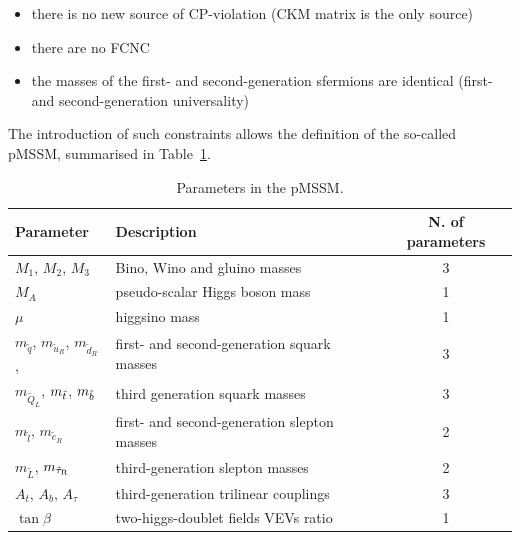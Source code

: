 				\begin{itemize}
					\item there is no new source of CP-violation (CKM matrix is the only source)
					\item there are no \ac{FCNC}
					\item the masses of the first- and second-generation sfermions are identical (first- and second-generation universality)
				\end{itemize}
				
				\noindent The introduction of such constraints allows the definition of the so-called \ac{pMSSM}, summarised in Table~\ref{tab:MSSM_mainFreePar}.
				
				\begin{table}[!htb]\centering\caption{Parameters in the pMSSM.}
				\renewcommand{\arraystretch}{1.3}
					\begin{tabular}{llc}
					\toprule
					\textbf{Parameter} & \textbf{Description} & \textbf{N. of parameters} \\ 
					\toprule

					$M_1$, $M_2$, $M_3$ & Bino, Wino and gluino masses & 3 \\ \midrule

					$M_{A}$	& pseudo-scalar Higgs boson mass	& 1 \\\midrule
					$\mu$  & higgsino mass & 1 \\\midrule

					$m_{\tilde{q}}$, $m_{\tilde{u}_R}$, $m_{\tilde{d}_R}$, & first- and second-generation squark masses & 3 \\
					$m_{\tilde{Q}_L}$, $m_{\tilde{t}}$, $m_{\tilde{b}}$ & third generation squark masses	&  3 \\\midrule

					$m_{\tilde{l}}$, $m_{\tilde{e}_R}$ & first- and second-generation slepton masses	 & 2 \\
					$m_{\tilde{L}}$, $m_{\tilde{\tau}_{\mathrm{R}}}$ & third-generation slepton masses	& 2 \\\midrule

					$A_t$, $A_b$, $A_{\tau}$ & third-generation trilinear couplings	& 3 \\\midrule

					$\tan \beta$ & two-higgs-doublet fields \ac{VEV}s ratio & 1 \\ 
					\bottomrule
					\end{tabular}
				\label{tab:MSSM_mainFreePar} 
				\end{table}

